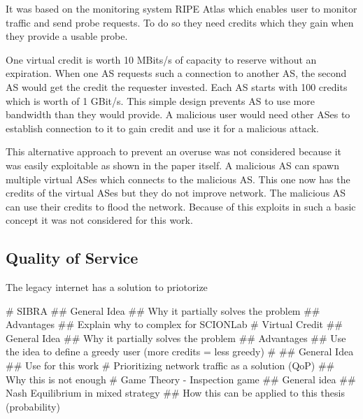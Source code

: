 \documentclass[thesis.tex]{subfiles}
\begin{document}
It was based on the monitoring system RIPE Atlas \cite{Ripenetworkcoordinationcentre.19.04.2018} which enables user to monitor traffic and send probe requests. To do so they need credits which they gain when they provide a usable probe.

One virtual credit is worth 10 MBits/s of capacity to reserve without an expiration. When one AS requests such a connection to another AS, the second AS would get the credit the requester invested. Each AS starts with 100 credits which is worth of 1 GBit/s. This simple design prevents AS to use more bandwidth than they would provide. A malicious user would need other ASes to establish connection to it to gain credit and use it for a malicious attack.

This alternative approach to prevent an overuse was not considered because it was easily exploitable as shown in the paper itself. A malicious AS can spawn multiple virtual ASes which connects to the malicious AS. This one now has the credits of the virtual ASes but they do not improve network. The malicious AS can use their credits to flood the network. Because of this exploits in such a basic concept it was not considered for this work.

\subsection{Quality of Service}
The legacy internet has a solution to priotorize 

\begin{easylist}
	\MyListProperties
	# SIBRA \cite{Basescu.2016}
	## General Idea
	## Why it partially solves the problem
	## Advantages
	## Explain why to complex for SCIONLab
	# Virtual Credit \cite{DennisMeyer.2017}
	## General Idea
	## Why it partially solves the problem
	## Advantages
	## Use the idea to define a greedy user (more credits = less greedy)
	# \cite{Zhu.2014}
	## General Idea
	## Use for this work
	# Prioritizing network traffic as a solution (QoP)
	## Why this is not enough 
	# Game Theory - Inspection game
	## General idea
	## Nash Equilibrium in mixed strategy
	## How this can be applied to this thesis (probability)
\end{easylist}

\subfilebib %
\end{document}
